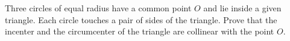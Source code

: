 Three circles of equal radius have a common point $O$ and lie inside a given triangle. Each circle touches a pair of sides of the triangle. Prove that the incenter and the circumcenter of the triangle are collinear with the point $O$.
